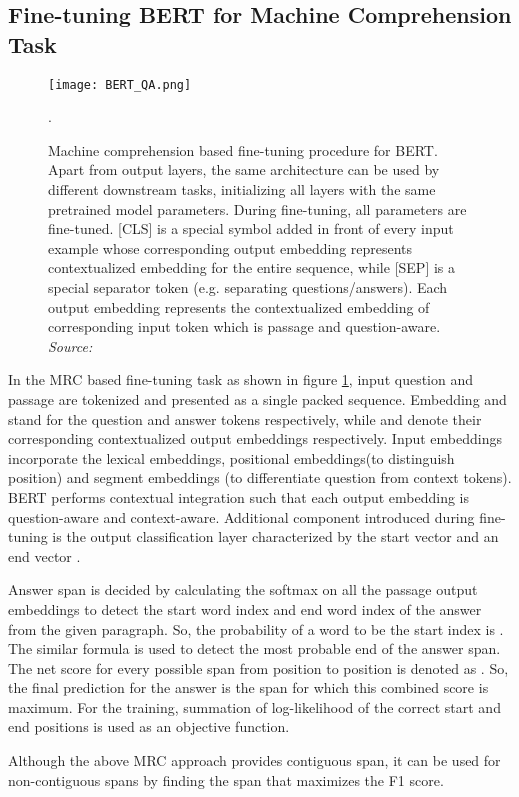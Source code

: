 \documentclass[acmsmall]{acmart}
\begin{document}
\subsection{Fine-tuning BERT for Machine Comprehension Task}
\begin{figure}[h]
\texttt{[image: BERT\_QA.png]}
 \caption{Machine comprehension based fine-tuning procedure for BERT. Apart from output layers, the same architecture can be used by different downstream tasks, initializing all layers with the same pretrained model parameters. During fine-tuning, all parameters are fine-tuned. [CLS] is a special symbol added in front of every input example whose corresponding output embedding represents contextualized embedding for the entire sequence, while [SEP] is a special separator token (e.g. separating questions/answers). Each output embedding represents the contextualized embedding of corresponding input token which is passage and question-aware. \textit{Source: \cite{bert}}}.
 \label{fig:bert_ft}
\end{figure}
\par In the MRC based fine-tuning task as shown in figure \ref{fig:bert_ft}, input question and passage are tokenized and presented as a single packed sequence. Embedding  and  stand for the question and answer tokens respectively, while  and  denote their corresponding contextualized output embeddings respectively. Input embeddings incorporate the lexical embeddings, positional embeddings(to distinguish position) and segment embeddings (to differentiate question from context tokens). BERT performs contextual integration such that each output embedding is question-aware and context-aware. Additional component introduced during fine-tuning is the output classification layer characterized by the start vector  and an end vector . 
\par Answer span is decided by calculating the softmax on all the passage output embeddings to detect the start word index and end word index of the answer from the given paragraph. So, the probability of a word  to be the start index is . The similar formula is used to detect the most probable end of the answer span. The net score for every possible span from position  to position  is denoted as  . So, the final prediction for the answer is the span for which this combined score is maximum. For the training, summation of log-likelihood of the correct start and end positions is used as an objective function.
\par Although the above MRC approach provides contiguous span, it can be used for non-contiguous spans by finding the span that maximizes the F1 score. 
\end{document}
